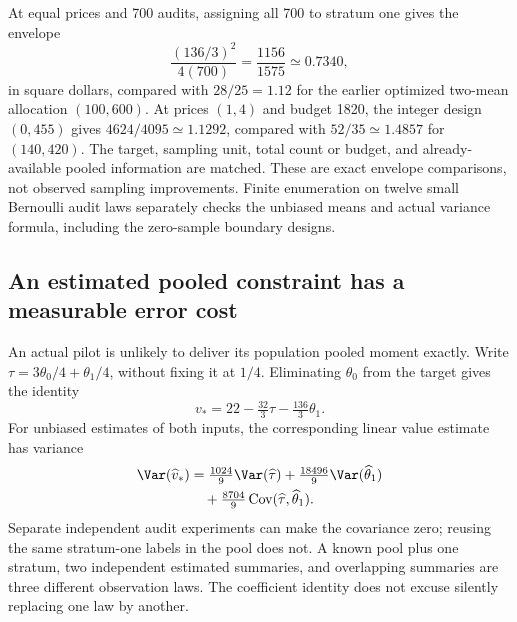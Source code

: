 At equal prices and 700 audits, assigning all 700 to stratum one gives the
envelope
\begin{equation}
 \frac{(136/3)^2}{4(700)}=\frac{1156}{1575}\simeq0.7340,
 \label{exec17:s7-pooled-count-comparison}
\end{equation}
in square dollars, compared with $28/25=1.12$ for the earlier optimized
two-mean allocation $(100,600)$. At prices $(1,4)$ and budget 1820, the
integer design $(0,455)$ gives $4624/4095\simeq1.1292$, compared with
$52/35\simeq1.4857$ for $(140,420)$. The target, sampling unit, total count
or budget, and already-available pooled information are matched. These are
exact envelope comparisons, not observed sampling improvements. Finite
enumeration on twelve small Bernoulli audit laws separately checks the
unbiased means and actual variance formula, including the zero-sample boundary
designs.~\citep{exec17_s7_extension}

\subsection{An estimated pooled constraint has a measurable error cost}
\label{exec17:s7-noisy-pool}

An actual pilot is unlikely to deliver its population pooled moment exactly.
Write $\tau=3\theta_0/4+\theta_1/4$, without fixing it at $1/4$.
Eliminating $\theta_0$ from the target gives the identity
\begin{equation}
 v_*=22-\tfrac{32}{3}\tau-\tfrac{136}{3}\theta_1.
 \label{exec17:s7-noisy-value}
\end{equation}
For unbiased estimates of both inputs, the corresponding linear value
estimate has variance
\begin{equation}
 \begin{split}
  \Var(\widehat v_*)&=\tfrac{1024}{9}\Var(\widehat\tau)
       +\tfrac{18496}{9}\Var(\widehat\theta_1)\\
       &\quad+\tfrac{8704}{9}
          \operatorname{Cov}(\widehat\tau,\widehat\theta_1).
 \end{split}
 \label{exec17:s7-noisy-variance}
\end{equation}
Separate independent audit experiments can make the covariance zero; reusing
the same stratum-one labels in the pool does not. A known pool plus one
stratum, two independent estimated summaries, and overlapping summaries are
three different observation laws. The coefficient identity does not excuse
silently replacing one law by another.

